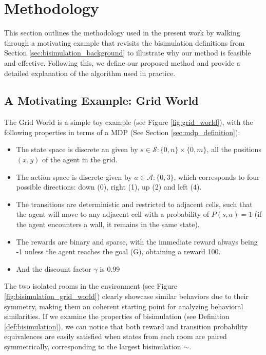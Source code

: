 
\chapter{Methodology}
This section outlines the methodology used in the present work by walking through a motivating example that revisits the bisimulation definitions from Section \ref{sec:bisimulation_background} to illustrate why our method is feasible and effective. Following this, we define our proposed method and provide a detailed explanation of the algorithm used in practice.

\section{A Motivating Example: Grid World}
\label{sec:motivating_example}

The Grid World is a simple toy example (see Figure \ref{fig:grid_world}), with the following properties in terms of a MDP (See Section \ref{sec:mdp_definition}):

\begin{itemize}
    \item The state space is discrete an given by $ s \in \mathcal{S} : \{0,n\} \times \{0,m\}$, all the positions $(x,y)$ of the agent in the grid.
    \item The action space is discrete given by $a \in \mathcal{A}: \{0,3\}$, which corresponds to four possible directions: down (0), right (1), up (2) and left (4).
    \item The transitions are deterministic and restricted to adjacent cells, such that the agent will move to any adjacent cell with a probability of $P(s,a) = 1$ (if the agent encounters a wall, it remains in the same state).
    \item The rewards are binary and sparse, with the immediate reward always being -1 unless the agent reaches the goal (G), obtaining a reward 100.
    \item And the discount factor $\gamma$ is 0.99
\end{itemize}

The two isolated rooms in the environment (see Figure \ref{fig:bisimulation_grid_world}) clearly showcase similar behaviors due to their symmetry, making them an coherent starting point for analyzing behavioral similarities. If we examine the properties of bisimulation (see Definition \ref{def:bisimulation}), we can notice that both reward and transition probability equivalences are easily satisfied when states from each room are paired symmetrically, corresponding to the largest bisimulation $\sim$.

